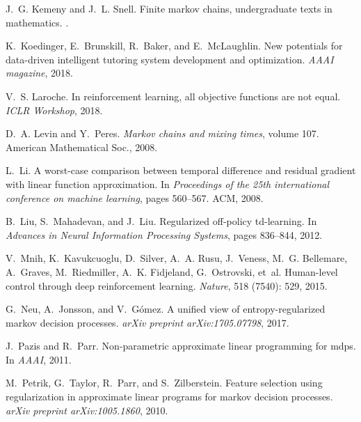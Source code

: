 \documentclass{article}
\begin{document}
\begin{thebibliography}{36}
J.~G. Kemeny and J.~L. Snell.
\newblock Finite markov chains, undergraduate texts in mathematics.
.

K.~Koedinger, E.~Brunskill, R.~Baker, and E.~McLaughlin.
\newblock New potentials for data-driven intelligent tutoring system
  development and optimization.
\newblock \emph{AAAI magazine}, 2018.

V.~S. Laroche.
\newblock In reinforcement learning, all objective functions are not equal.
\newblock \emph{ICLR Workshop}, 2018.

D.~A. Levin and Y.~Peres.
\newblock \emph{Markov chains and mixing times}, volume 107.
\newblock American Mathematical Soc., 2008.

L.~Li.
\newblock A worst-case comparison between temporal difference and residual
  gradient with linear function approximation.
\newblock In \emph{Proceedings of the 25th international conference on machine
  learning}, pages 560--567. ACM, 2008.

B.~Liu, S.~Mahadevan, and J.~Liu.
\newblock Regularized off-policy td-learning.
\newblock In \emph{Advances in Neural Information Processing Systems}, pages
  836--844, 2012.

V.~Mnih, K.~Kavukcuoglu, D.~Silver, A.~A. Rusu, J.~Veness, M.~G. Bellemare,
  A.~Graves, M.~Riedmiller, A.~K. Fidjeland, G.~Ostrovski, et~al.
\newblock Human-level control through deep reinforcement learning.
\newblock \emph{Nature}, 518 (7540): 529, 2015.

G.~Neu, A.~Jonsson, and V.~G{\'o}mez.
\newblock A unified view of entropy-regularized markov decision processes.
\newblock \emph{arXiv preprint arXiv:1705.07798}, 2017.

J.~Pazis and R.~Parr.
\newblock Non-parametric approximate linear programming for mdps.
\newblock In \emph{AAAI}, 2011.

M.~Petrik, G.~Taylor, R.~Parr, and S.~Zilberstein.
\newblock Feature selection using regularization in approximate linear programs
  for markov decision processes.
\newblock \emph{arXiv preprint arXiv:1005.1860}, 2010.


\end{thebibliography}
\end{document}

